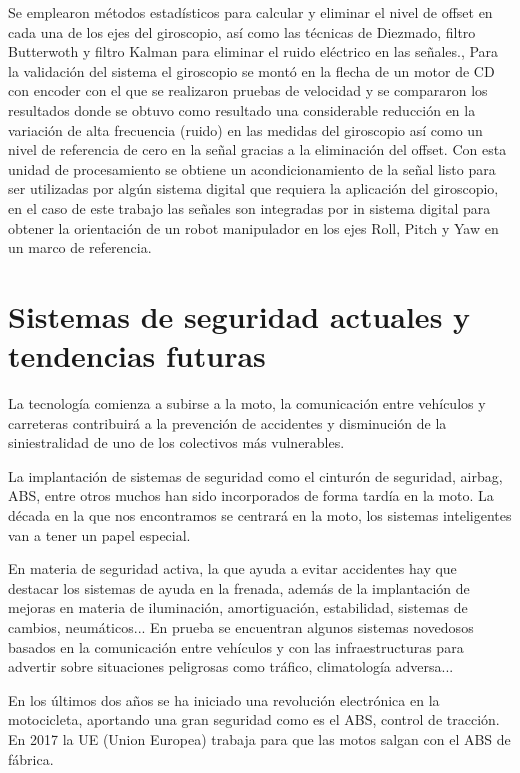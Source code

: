 		Se emplearon métodos estadísticos para calcular y eliminar el nivel de offset en cada una de los ejes del giroscopio, así como las técnicas de Diezmado, filtro Butterwoth y filtro Kalman para eliminar el ruido eléctrico en las señales., Para la validación del sistema el giroscopio se montó en la flecha de un motor de CD con encoder con el que se realizaron pruebas de velocidad y se compararon los resultados donde se obtuvo como resultado una considerable reducción en la variación de alta frecuencia (ruido) en las medidas del giroscopio así como un nivel de referencia de cero en la señal gracias a la eliminación del offset. Con esta unidad de procesamiento se obtiene un acondicionamiento de la señal listo para ser utilizadas por algún sistema digital que requiera la aplicación del giroscopio, en el caso de este trabajo las señales son integradas por in sistema digital para obtener la orientación de un robot manipulador en los ejes Roll, Pitch y Yaw en un marco de referencia. \cite{robots}		
	
	

	
	\section{Sistemas de seguridad actuales y tendencias futuras}
	
		La tecnología comienza a subirse a la moto, la comunicación entre vehículos y carreteras contribuirá a la prevención de accidentes y disminución de la siniestralidad de uno de los colectivos más vulnerables.
		
		La implantación de sistemas de seguridad como el cinturón de seguridad, airbag, ABS, entre otros muchos han sido incorporados de forma tardía en la moto. La década en la que nos encontramos se centrará en la moto, los sistemas inteligentes van a tener un papel especial.
		
		En materia de seguridad activa, la que ayuda a evitar accidentes hay que destacar los sistemas de ayuda en la frenada, además de la implantación de mejoras en materia de iluminación, amortiguación, estabilidad, sistemas de cambios, neumáticos... En prueba se encuentran algunos sistemas novedosos basados en la comunicación entre vehículos y con las infraestructuras para advertir sobre situaciones peligrosas como tráfico, climatología adversa...
		
		En los últimos dos años se ha iniciado una revolución electrónica en la motocicleta, aportando una gran seguridad como es el ABS, control de tracción. En 2017 la UE (Union Europea) trabaja para que las motos salgan con el ABS de fábrica.
		
